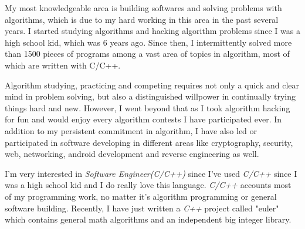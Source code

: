 \documentclass[11pt]{letter} %
\newcommand{\job}{\emph{Software Engineer(C/C++)}}
\begin{document}
\begin{letter}{
}



My most knowledgeable area is building softwares and solving problems with algorithms, which is due to my hard working
in this area in the past several years.  
I started studying algorithms and hacking algorithm problems since I was a high school kid, which was 6 years ago. 
Since then, I intermittently solved more than 1500 pieces of programs among a vast area of topics in algorithm, most of which are written with C/C++.

Algorithm studying, practicing and competing requires not only a quick and clear mind in problem solving, but also a distinguished willpower in continually trying things hard and new.
However, I went beyond that as I took algorithm hacking for fun and would enjoy every algorithm contests I have participated ever.
In addition to my persistent commitment in algorithm, I have also led or participated in software developing in different areas like cryptography, security, web, networking, android development and reverse engineering as well. 

I'm very interested in \job{} since I've used \emph{C/C++} since I was a high school kid and I do really
love this language. \emph{C/C++} accounts most of my programming work, no matter it's algorithm
programming or general software building.  Recently, I have just written a \emph{C++} project called "euler" 
which contains general math algorithms and an independent big integer library.



\end{letter}
\end{document}
